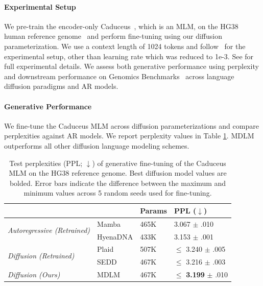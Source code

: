 \documentclass{article} %
\def\algo{MDLM}
\begin{document}
{\paragraph{Experimental Setup}

We pre-train the encoder-only Caduceus~\citep{schiff2024caduceus}, which is an MLM, on the HG38 human reference genome~\citep{hg38} and perform fine-tuning using our diffusion parameterization.
We use a context length of 1024 tokens and follow~\citet{schiff2024caduceus} for the experimental setup,
other than learning rate which was reduced to 1e-3.
See  for full experimental details.
We assess both generative performance using perplexity and downstream performance on Genomics Benchmarks~\citep{grevsova2023genomic} across language diffusion paradigms and AR models.




\paragraph{Generative Performance}
We fine-tune the Caduceus MLM across diffusion parameterizations and compare perplexities against AR models. We report perplexity values in Table \ref{tab:genome-ppl}.
\algo{} outperforms all other diffusion language modeling schemes.
\begin{table}[t!]
  \caption{Test perplexities (PPL; $\downarrow$) of generative fine-tuning of the Caduceus MLM \citep{schiff2024caduceus} on the HG38 reference genome.
  Best diffusion model values are bolded.
  Error bars indicate the difference between the maximum and minimum values across 5 random seeds used for fine-tuning.}
  \label{tab:genome-ppl}
  \centering
  \begin{tabular}{llll}
    \toprule
    && Params & PPL ($\downarrow$) \\
    \midrule
    \multirow{2}{*}{\textit{Autoregressive (Retrained)}}& Mamba & 465K & 3.067 $\pm$ .010 \\
    & HyenaDNA & 433K & 3.153 $\pm$ .001\\
    \midrule 
    \multirow{2}{*}{\textit{Diffusion (Retrained)}}& Plaid & 507K & $\leq$ 3.240 $\pm$ .005 \\
    & SEDD & 467K & $ \leq$ 3.216 $\pm$ .003 \\
    
    \midrule
    \textit{Diffusion (Ours)} & \algo{}   & 467K & $\leq$ \textbf{3.199} $\pm$ .010 \\
    \bottomrule
  \end{tabular}
\end{table}


}
\end{document}
